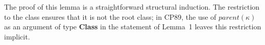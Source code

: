 \begin{AgdaAlign}
The proof of this lemma is a straightforward structural induction.
The restriction to the class  ensures that it is not the root class;
in CP89, the use of $\textit{parent}(κ)$ as an argument of type \textbf{Class}
in the statement of Lemma~1 leaves this restriction implicit.
%
\begin{code}%
%
\>[4]\AgdaSpace{}%
\AgdaSymbol{:}\AgdaSpace{}%
\AgdaSpace{}%
\AgdaSpace{}%
\AgdaSpace{}%
\AgdaSpace{}%
\AgdaSpace{}%
\AgdaSpace{}%
\AgdaSpace{}%
\AgdaSpace{}%
\AgdaSymbol{(}\AgdaSpace{}%
\AgdaSymbol{)}\AgdaSpace{}%
\AgdaSpace{}%
\AgdaSpace{}%
\AgdaSpace{}%
\AgdaSpace{}%
\AgdaSymbol{(}\AgdaSpace{}%
\AgdaSpace{}%
\AgdaSymbol{)}\AgdaSpace{}%
\AgdaSpace{}%
\AgdaSpace{}%
\AgdaSpace{}%
\AgdaSpace{}%
\AgdaSymbol{(}\AgdaSpace{}%
\AgdaSpace{}%
\AgdaSymbol{)}\AgdaSpace{}%
\AgdaSymbol{(}\AgdaSpace{}%
\AgdaSymbol{(}\AgdaSpace{}%
\AgdaSymbol{)}\AgdaSpace{}%
\AgdaSpace{}%
\AgdaSymbol{)}\<%
\\
%
\\[\AgdaEmptyExtraSkip]%
%
\>[4]\AgdaSpace{}%
\AgdaSpace{}%
\AgdaSpace{}%
\AgdaSpace{}%
\AgdaSpace{}%
\AgdaSpace{}%
\AgdaSymbol{=}\<%
\\
\>[4][@{}l@{\AgdaIndent{0}}]%
\>[6]%
\>[13]\AgdaSpace{}%
\AgdaSymbol{(}\AgdaSpace{}%
\AgdaSymbol{)}\AgdaSpace{}%
\AgdaSpace{}%
\AgdaSpace{}%
\AgdaSpace{}%
\AgdaSpace{}%
\AgdaSymbol{(}\AgdaSpace{}%
\AgdaSpace{}%
\AgdaSymbol{)}\<%
\\
%
\>[6]%
\>[13]\AgdaSymbol{(}\AgdaSpace{}%
\AgdaSpace{}%
\AgdaSpace{}%
\AgdaSpace{}%
\AgdaSpace{}%

\end{code}
\end{AgdaAlign}
